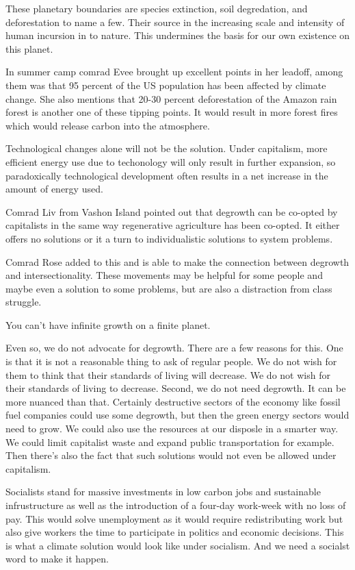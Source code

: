 \documentclass{article}
\begin{document}
These planetary boundaries are species extinction, soil degredation, and deforestation to name a few. Their source in the increasing scale and intensity of human incursion in to nature. This undermines the basis for our own existence on this planet.

In summer camp comrad Evee brought up excellent points in her leadoff, among them was that 95 percent of the US population has been affected by climate change. She also mentions that 20-30 percent deforestation of the Amazon rain forest is another one of these tipping points. It would result in more forest fires which would release carbon into the atmosphere.

Technological changes alone will not be the solution. Under capitalism, more efficient energy use due to techonology will only result in further expansion, so paradoxically technological development often results in a net increase in the amount of energy used.

Comrad Liv from Vashon Island pointed out that degrowth can be co-opted by capitalists in the same way regenerative agriculture has been co-opted. It either offers no solutions or it a turn to individualistic solutions to system problems.

Comrad Rose added to this and is able to make the connection between degrowth and intersectionality. These movements may be helpful for some people and maybe even a solution to some problems, but are also a distraction from class struggle.

You can't have infinite growth on a finite planet.

Even so, we do not advocate for degrowth. There are a few reasons for this. One is that it is not a reasonable thing to ask of regular people. We do not wish for them to think that their standards of living will decrease. We do not wish for their standards of living to decrease. Second, we do not need degrowth. It can be more nuanced than that. Certainly destructive sectors of the economy like fossil fuel companies could use some degrowth, but then the green energy sectors would need to grow. We could also use the resources at our disposle in a smarter way. We could limit capitalist waste and expand public transportation for example. Then there's also the fact that such solutions would not even be allowed under capitalism.

Socialists stand for massive investments in low carbon jobs and sustainable infrustructure as well as the introduction of a four-day work-week with no loss of pay. This would solve unemployment as it would require redistributing work but also give workers the time to participate in politics and economic decisions. This is what a climate solution would look like under socialism. And we need a socialst word to make it happen.
\end{document}
